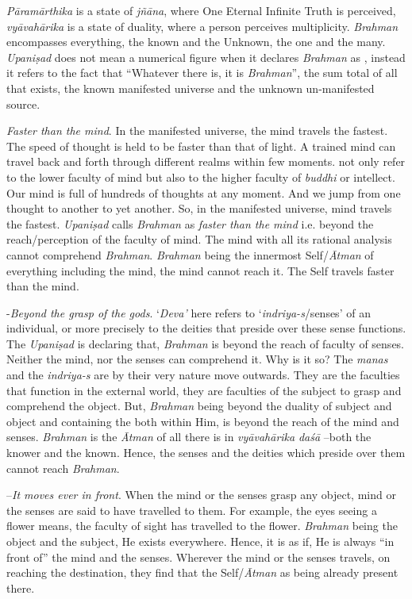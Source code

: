 \emph{Pāramārthika} is a state of \emph{jñāna}, where One Eternal Infinite Truth is perceived, \emph{vyāvahārika} is a state of duality, where a person perceives multiplicity. \emph{Brahman} encompasses everything, the known and the Unknown, the one and the many. \emph{Upaniṣad} does not mean a numerical figure when it declares \emph{Brahman} as , instead it refers to the fact that ``Whatever there is, it is \emph{Brahman}'', the sum total of all that exists, the known manifested universe and the unknown un-manifested source.

 \emph{Faster than the mind}. In the manifested universe, the mind travels the fastest. The speed of thought is held to be faster than that of light. A trained mind can travel back and forth through different realms within few moments.  not only refer to the lower faculty of mind but also to the higher faculty of \emph{buddhi} or intellect. Our mind is full of hundreds of thoughts at any moment. And we jump from one thought to another to yet another. So, in the manifested universe, mind travels the fastest. \emph{Upaniṣad} calls \emph{Brahman} as \emph{faster than the mind} i.e. beyond the reach/perception of the faculty of mind. The mind with all its rational analysis cannot comprehend \emph{Brahman}. \emph{Brahman} being the innermost Self/\emph{Ātman} of everything including the mind, the mind cannot reach it. The Self travels faster than the mind.

 -\emph{Beyond the grasp of the gods}. `\emph{Deva'} here refers to `\emph{indriya-s}/senses' of an individual, or more precisely to the deities that preside over these sense functions. The \emph{Upaniṣad} is declaring that, \emph{Brahman} is beyond the reach of faculty of senses. Neither the mind, nor the senses can comprehend it. Why is it so? The \emph{manas} and the \emph{indriya-s} are by their very nature move outwards. They are the faculties that function in the external world, they are faculties of the subject to grasp and comprehend the object. But, \emph{Brahman} being beyond the duality of subject and object and containing the both within Him, is beyond the reach of the mind and senses. \emph{Brahman} is the \emph{Ātman} of all there is in \emph{vyāvahārika} \emph{daśā} --both the knower and the known. Hence, the senses and the deities which preside over them cannot reach \emph{Brahman}.

 --\emph{It moves ever in front}. When the mind or the senses grasp any object, mind or the senses are said to have travelled to them. For example, the eyes seeing a flower means, the faculty of sight has travelled to the flower. \emph{Brahman} being the object and the subject, He exists everywhere. Hence, it is as if, He is always ``in front of'' the mind and the senses. Wherever the mind or the senses travels, on reaching the destination, they find that the Self/\emph{Ātman} as being already present there.

